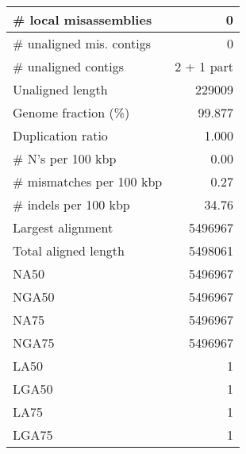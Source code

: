 \documentclass[12pt,a4paper]{article}
\begin{document}
\begin{table}[ht]
\begin{center}
\begin{tabular}{|l*{1}{|r}|}
\# local misassemblies & 0 \\ \hline
\# unaligned mis. contigs & 0 \\ \hline
\# unaligned contigs & 2 + 1 part \\ \hline
Unaligned length & 229009 \\ \hline
Genome fraction (\%) & 99.877 \\ \hline
Duplication ratio & 1.000 \\ \hline
\# N's per 100 kbp & 0.00 \\ \hline
\# mismatches per 100 kbp & 0.27 \\ \hline
\# indels per 100 kbp & 34.76 \\ \hline
Largest alignment & 5496967 \\ \hline
Total aligned length & 5498061 \\ \hline
NA50 & 5496967 \\ \hline
NGA50 & 5496967 \\ \hline
NA75 & 5496967 \\ \hline
NGA75 & 5496967 \\ \hline
LA50 & 1 \\ \hline
LGA50 & 1 \\ \hline
LA75 & 1 \\ \hline
LGA75 & 1 \\ \hline
\end{tabular}
\end{center}
\end{table}
\end{document}
